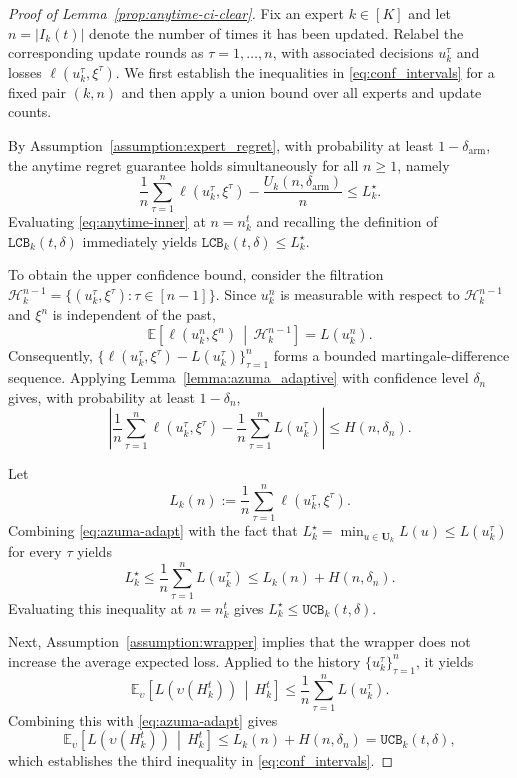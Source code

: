 \documentclass[a4paper,14pt]{extarticle}
\theoremstyle{plain}
\newcommand{\LCB}{\texttt{LCB}}
\newcommand{\UCB}{\texttt{UCB}}
\begin{document}
\begin{proof}[Proof of Lemma~\ref{prop:anytime-ci-clear}]

Fix an expert $k\in[K]$ and let $n=|I_k(t)|$ denote the number of times
it has been updated. Relabel the corresponding update rounds as
$\tau=1,\ldots,n$, with associated decisions $u_k^\tau$ and losses
$\ell(u_k^\tau,\xi^\tau)$. We first establish the inequalities in
\eqref{eq:conf_intervals} for a fixed pair $(k,n)$ and then apply a
union bound over all experts and update counts.

By Assumption~\ref{assumption:expert_regret}, with probability at least
$1-\delta_{\mathrm{arm}}$, the anytime regret guarantee holds
simultaneously for all $n\ge 1$, namely
\begin{equation}
\label{eq:anytime-inner}
\frac1n\sum_{\tau=1}^{n}
\ell(u_k^\tau,\xi^\tau)
-
\frac{U_k(n,\delta_{\mathrm{arm}})}{n}
\le
L_k^\star.
\end{equation}
Evaluating \eqref{eq:anytime-inner} at $n=n_k^t$ and recalling the
definition of $\LCB_k(t,\delta)$ immediately yields
$\LCB_k(t,\delta)\le L_k^\star$.

To obtain the upper confidence bound, consider the filtration
$\mathcal H_k^{n-1}
=
\{(u_k^\tau,\xi^\tau):\tau\in[n-1]\}$.
Since $u_k^n$ is measurable with respect to $\mathcal H_k^{n-1}$ and
$\xi^n$ is independent of the past,
\[
\mathbb E\!\left[
\ell(u_k^n,\xi^n)
\,\middle|\,
\mathcal H_k^{n-1}
\right]
=
L(u_k^n).
\]
Consequently,
$\{\ell(u_k^\tau,\xi^\tau)-L(u_k^\tau)\}_{\tau=1}^n$
forms a bounded martingale-difference sequence. Applying
Lemma~\ref{lemma:azuma_adaptive} with confidence level $\delta_n$
gives, with probability at least $1-\delta_n$,
\begin{equation}
\label{eq:azuma-adapt}
\left|
\frac1n\sum_{\tau=1}^{n}\ell(u_k^\tau,\xi^\tau)
-
\frac1n\sum_{\tau=1}^{n}L(u_k^\tau)
\right|
\le
H(n,\delta_n).
\end{equation}

Let
\[
L_k(n)
:=
\frac1n
\sum_{\tau=1}^{n}
\ell(u_k^\tau,\xi^\tau).
\]
Combining \eqref{eq:azuma-adapt} with the fact that
$L_k^\star=\min_{u\in\mathbf U_k}L(u)\le L(u_k^\tau)$ for every
$\tau$ yields
\begin{equation}
L_k^\star
\le
\frac1n\sum_{\tau=1}^{n}L(u_k^\tau)
\le
L_k(n)+H(n,\delta_n).
\end{equation}
Evaluating this inequality at $n=n_k^t$ gives
$L_k^\star\le \UCB_k(t,\delta)$.

Next, Assumption~\ref{assumption:wrapper} implies that the wrapper does
not increase the average expected loss. Applied to the history
$\{u_k^\tau\}_{\tau=1}^{n}$, it yields
\begin{equation}
\mathbb E_{\upsilon}
\!\left[
L(\upsilon(H_k^t))
\,\middle|\,
H_k^t
\right]
\le
\frac1n\sum_{\tau=1}^{n}L(u_k^\tau).
\end{equation}
Combining this with \eqref{eq:azuma-adapt} gives
\begin{equation}
\mathbb E_{\upsilon}
\!\left[
L(\upsilon(H_k^t))
\,\middle|\,
H_k^t
\right]
\le
L_k(n)+H(n,\delta_n)
=
\UCB_k(t,\delta),
\end{equation}
which establishes the third inequality in
\eqref{eq:conf_intervals}.


\end{proof}
\end{document}
